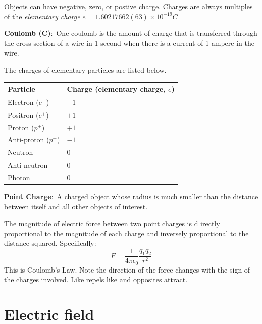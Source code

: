 \documentclass[nobib]{tufte-handout}
\newcommand{\defn}[2]{\noindent\textbf{#1}:\ #2}
\begin{document}
Objects can have negative, zero, or postive charge. 
Charges are always multiples of the \emph{elementary charge} $e = 1.60217662(63) \times 10^{-19} C$

\defn{Coulomb (C)}{One coulomb is the amount of charge that is
transferred through the cross section of a wire in 1 second
when there is a current of 1 ampere in the wire.}

The charges of elementary particles are listed below.
\begin{table}[ht]
    \centering
    \begin{tabular}{@{}ll@{}}
    \toprule
    Particle & Charge (elementary charge, $e$) \\
    \midrule
    Electron ($e^-$) & $-1$ \\
    Positron ($e^+$) & $+1$ \\
    Proton ($p^+$) & $+1$ \\
    Anti-proton ($p^-$) & $-1$ \\
    Neutron& $0$ \\
    Anti-neutron & $0$ \\
    Photon& $0$ \\
    \bottomrule
    \end{tabular}
    \end{table}

\defn{Point Charge}{A charged object whose
radius is much smaller than the distance
between itself and all other objects of
interest.}

The magnitude of electric force between two point charges is d
irectly proportional to the magnitude of each charge and 
inversely proportional to the distance squared. Specifically:
\[F = \frac{1}{4\pi \epsilon_0}\frac{q_1 q_2}{r^2}\]
This is Coulomb's Law. Note the direction of the force changes
with the sign of the charges involved. Like repels like and opposites
attract. 

\pagebreak 

\section{Electric field}
\end{document}
